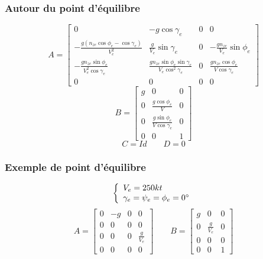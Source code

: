 \documentclass[tikz, footheight=2em]{beamer}
\begin{document}
\begin{frame}
    \frametitle{Autour du point d'équilibre}\pause{}
    \[
    A =
    \left[
    \begin{array}{cccc}
        0 & -g \cos \gamma_e & 0 & 0 \\
        -\frac{g(n_{ze} \cos \phi_e - \cos \gamma_e)}{V_e^2}
            & \frac{g}{V_e}\sin \gamma_e & 0
            & -\frac{gn_{ze}}{V_e}\sin \phi_e \\
        -\frac{gn_{ze} \sin \phi_e}{V_e^2 \cos \gamma_e}
            & \frac{gn_{ze} \sin \phi_e \sin \gamma_e}{V_e \cos^2 \gamma_e}
            & 0 & \frac{gn_{ze}\cos \phi_e}{V \cos \gamma_e} \\
        0 & 0 & 0 & 0
    \end{array}
    \right]
    \]\pause{}
    \[
    B =
    \left[
    \begin{array}{cccc}
        g & 0 & 0 \\
        0 & \frac{g\cos \phi_e}{V} & 0 \\
        0 & \frac{g\sin \phi_e}{V\cos \gamma_e} & 0 \\
        0 & 0 & 1
    \end{array}
    \right]
    \]\pause{}
    \[
    C = Id \qquad D = 0
    \]
\end{frame}

\begin{frame}
    \frametitle{Exemple de point d'équilibre}\pause{}
    \[
    \left \{
    \begin{array}{l}
        V_e = 250 kt \\
        \gamma_e = \psi_e = \phi_e = 0 \degree
    \end{array}
    \right.
    \]
    \[
    A =
    \left[
    \begin{array}{cccc}
        0 & -g & 0 & 0 \\
        0 & 0 & 0 & 0 \\
        0 & 0 & 0 & \frac{g}{V_e} \\
        0 & 0 & 0 & 0
    \end{array}
    \right]
    \qquad
    B =
    \left[
    \begin{array}{cccc}
        g & 0 & 0 \\
        0 & \frac{g}{V_e} & 0 \\
        0 & 0 & 0 \\
        0 & 0 & 1
    \end{array}
    \right]
    \]
\end{frame}
\end{document}
